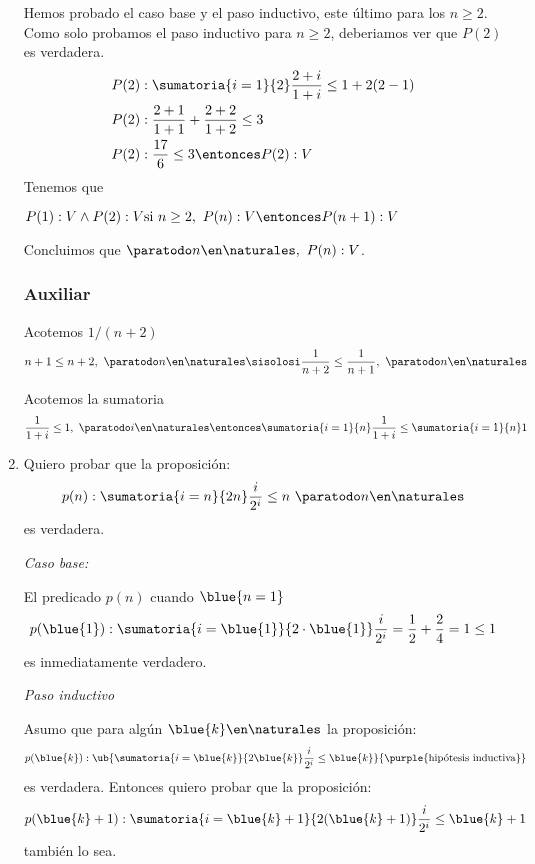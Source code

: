 \begin{enumerate}[label=\magenta{\roman*)}]
        Hemos probado el caso base y el paso inductivo, este último para los $n \geq 2$. Como solo probamos el paso
        inductivo para $n \geq 2$, deberiamos ver que $P(2)$ es verdadera.
        \begin{align*}
          P(2) & : \sumatoria{i=1}{2} \frac{2+i}{1+i} \leq 1 + 2(2-1) \\
          P(2) & : \frac{2+1}{1+1} + \frac{2+2}{1+2} \leq 3           \\
          P(2) & : \frac{17}{6} \leq 3 \entonces P(2): V
        \end{align*}
        Tenemos que

        $P(1): V \land P(2): V \\
          \text{si } n \geq 2, \ P(n): V \entonces P(n+1): V$

        Concluimos que $\paratodo n \en \naturales, \ P(n): V$.

        \subsubsection*{Auxiliar}
        Acotemos $1/(n+2)$
        \begin{align*}
          n+1 \leq n + 2 , \ \paratodo n \en \naturales \sisolosi \frac{1}{n+2} \leq \frac{1}{n+1},
          \ \paratodo n \en \naturales
        \end{align*}

        Acotemos la sumatoria
        \begin{align*}
          \frac{1}{1+i} \leq 1, \ \paratodo i \en \naturales \entonces \sumatoria{i=1}{n} \frac{1}{1+i} \leq \sumatoria{i=1}{n} 1
        \end{align*}

  \item
        Quiero probar que la proposición:
        $$
          p(n): \sumatoria{i = n}{2n} \frac{i}{2^i} \leq n ~ \paratodo n \en \naturales
        $$
        es verdadera.

        \textit{Caso base:}

        El predicado $p(n)$ cuando $\blue{n = 1}$
        $$
          p(\blue{1}) : \sumatoria{i = \blue{1}}{2 \cdot \blue{1}} \frac{i}{2^i} = \frac{1}{2} + \frac{2}{4} = 1 \leq 1
        $$
        es inmediatamente verdadero.

        \medskip

        \textit{Paso inductivo}

        Asumo que para algún $\blue{k} \en \naturales$ la proposición:
        $$
          p(\blue{k}):
          \ub{
            \sumatoria{i = \blue{k}}{2\blue{k}} \frac{i}{2^i} \leq \blue{k}
          }{
            \text{\purple{hipótesis inductiva}}
          }
        $$
        es verdadera. Entonces quiero probar que la proposición:
        $$
          p(\blue{k} + 1): \sumatoria{i = \blue{k} + 1}{2(\blue{k} + 1)} \frac{i}{2^i} \leq \blue{k} + 1
        $$
        también lo sea.


\end{enumerate}
